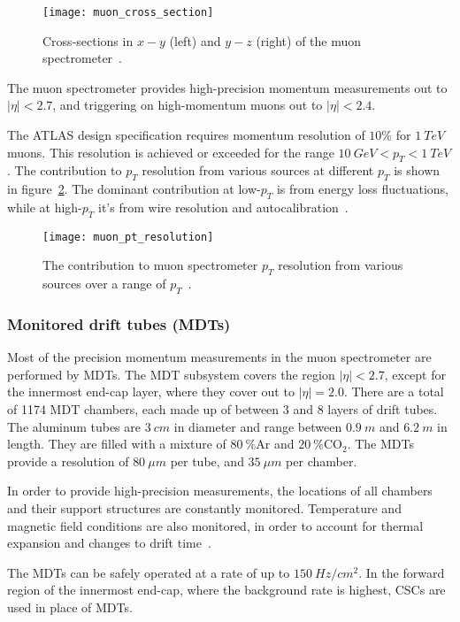 \begin{figure}[!ht]\centering
\texttt{[image: muon\_cross\_section]}
\caption{Cross-sections in $x-y$ (left) and $y-z$ (right) of the muon spectrometer~\cite{muon-2003}.}
\label{fig:muon_cross_section}
\end{figure}

The muon spectrometer provides high-precision momentum measurements out to $|\eta| < 2.7$,
and triggering on high-momentum muons out to $|\eta| < 2.4$.

The ATLAS design specification requires momentum resolution of $10\%$ for $1~TeV$ muons.
This resolution is achieved or exceeded for the range $10~GeV < p_T < 1~TeV$.
The contribution to $p_T$ resolution from various sources at different $p_T$ is shown in figure~\ref{fig:muon_resolution}.
The dominant contribution at low-$p_T$ is from energy loss fluctuations,
while at high-$p_T$ it's from wire resolution and autocalibration~\cite{muon-2003}.

\begin{figure}[!ht]\centering
\texttt{[image: muon\_pt\_resolution]}
\caption{The contribution to muon spectrometer $p_T$ resolution from various sources over a range of $p_T$~\cite{muon-2003}.}
\label{fig:muon_resolution}
\end{figure}

\subsubsection{Monitored drift tubes (MDTs)}
Most of the precision momentum measurements in the muon spectrometer are performed by MDTs.
The MDT subsystem covers the region $|\eta| < 2.7$, except for the innermost end-cap layer,
where they cover out to $|\eta| = 2.0$.
There are a total of 1174 MDT chambers, each made up of between 3 and 8 layers of drift tubes.
The aluminum tubes are $3~cm$ in diameter and range between $0.9~m$ and $6.2~m$ in length.
They are filled with a mixture of $80~\% \mathrm{Ar}$ and  $20~\% \mathrm{CO_2}$.
The MDTs provide a resolution of $80~\mu m$ per tube, and $35~\mu m$ per chamber.

In order to provide high-precision measurements, the locations of all chambers and their support structures are constantly monitored.
Temperature and magnetic field conditions are also monitored, in order to account for thermal expansion and changes to drift time~\cite{muon-2003}.

The MDTs can be safely operated at a rate of up to $150~Hz/cm^2$.
In the forward region of the innermost end-cap, where the background rate is highest, CSCs are used in place of MDTs.

